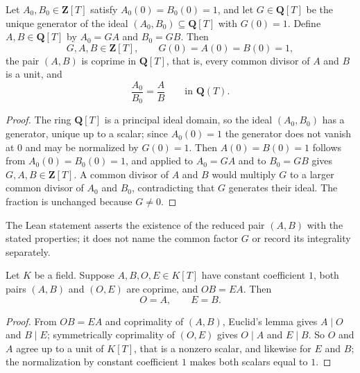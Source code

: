 \begin{proposition}
\label{prop:zla-normalized-gcd-reduction}
\leanok
Let $A_0,B_0\in\mathbf Z[T]$ satisfy $A_0(0)=B_0(0)=1$, and let
$G\in\mathbf Q[T]$ be the unique generator of the ideal
$(A_0,B_0)\subseteq\mathbf Q[T]$ with $G(0)=1$.  Define
$A,B\in\mathbf Q[T]$ by $A_0=GA$ and $B_0=GB$.  Then
\[
  G,A,B\in\mathbf Z[T],
  \qquad
  G(0)=A(0)=B(0)=1,
\]
the pair $(A,B)$ is coprime in $\mathbf Q[T]$, that is, every common divisor
of $A$ and $B$ is a unit, and
\[
  \frac{A_0}{B_0}=\frac{A}{B}
  \qquad\text{in }\mathbf Q(T).
\]
\end{proposition}
\begin{proof}
\leanok
The ring $\mathbf Q[T]$ is a principal ideal domain, so the ideal
$(A_0,B_0)$ has a generator, unique up to a scalar; since $A_0(0)=1$ the
generator does not vanish at $0$ and may be normalized by $G(0)=1$.  Then
$A(0)=B(0)=1$ follows from $A_0(0)=B_0(0)=1$, and
 applied to $A_0=GA$ and to $B_0=GB$ gives
$G,A,B\in\mathbf Z[T]$.  A common divisor of $A$ and $B$ would multiply $G$ to
a larger common divisor of $A_0$ and $B_0$, contradicting that $G$ generates
their ideal.  The fraction is unchanged because $G\neq0$.
\end{proof}

The Lean statement asserts the existence of the reduced pair $(A,B)$ with
the stated properties; it does not name the common factor $G$ or record its
integrality separately.

\begin{lemma}
\label{lem:zla-normalized-fraction-unique}
\leanok
Let $K$ be a field.  Suppose $A,B,O,E\in K[T]$ have constant coefficient $1$,
both pairs $(A,B)$ and $(O,E)$ are coprime, and $OB=EA$.  Then
\[
  O=A,\qquad E=B.
\]
\end{lemma}
\begin{proof}
\leanok
From $OB=EA$ and coprimality of $(A,B)$, Euclid's lemma gives $A\mid O$ and
$B\mid E$; symmetrically coprimality of $(O,E)$ gives $O\mid A$ and
$E\mid B$.  So $O$ and $A$ agree up to a unit of $K[T]$, that is a nonzero
scalar, and likewise for $E$ and $B$; the normalization by constant
coefficient $1$ makes both scalars equal to $1$.
\end{proof}

